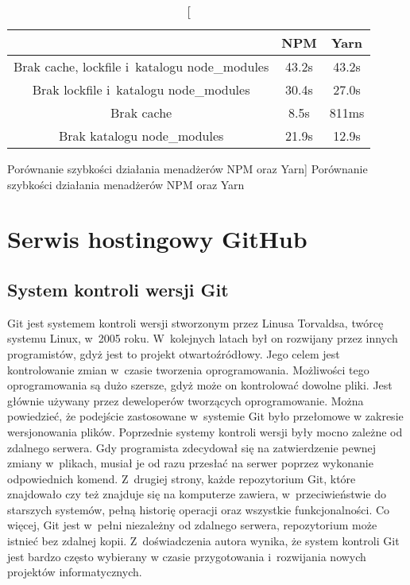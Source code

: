 \documentclass[../Kamil_Kowalewski_Main.tex]{subfiles}
\begin{document}
{{{            \begin{table}[H]
                \centering
                \begin{tabular}{|c|c|c|}
                    \hline
                    & NPM & Yarn \\ \hline
                    Brak cache, lockfile i~katalogu node\_modules & 43.2s & 43.2s \\\hline
                    Brak lockfile i~katalogu node\_modules & 30.4s & 27.0s \\ \hline
                    Brak cache & 8.5s & 811ms \\ \hline
                    Brak katalogu node\_modules & 21.9s & 12.9s \\ \hline
                \end{tabular}
                \caption
                [Porównanie szybkości działania menadżerów NPM oraz Yarn]
                {Porównanie szybkości działania menadżerów NPM oraz Yarn}
                \label{chapter3:technologie:node:yarn:tabela_porow}
            \end{table}
        }
    }

    \section{Serwis hostingowy GitHub}
    \label{chapter3:technologie:github} {

        \subsection{System kontroli wersji Git}
        \label{chapter3:technologie:github:git} {
            Git\cite{website:git} jest systemem kontroli wersji stworzonym przez
            Linusa Torvaldsa, twórcę systemu Linux, w~2005 roku. W~kolejnych latach był
            on rozwijany przez innych programistów, gdyż jest to projekt otwartoźródłowy.
            Jego celem jest kontrolowanie zmian w~czasie tworzenia oprogramowania. Możliwości
            tego oprogramowania są dużo szersze, gdyż może on kontrolować dowolne pliki.
            Jest głównie używany przez deweloperów tworzących oprogramowanie. Można
            powiedzieć, że podejście zastosowane w~systemie Git było przełomowe w zakresie
            wersjonowania plików. Poprzednie systemy kontroli wersji były mocno zależne od zdalnego
            serwera. Gdy programista zdecydował się na zatwierdzenie pewnej zmiany
            w~plikach, musiał je od razu przesłać na serwer poprzez wykonanie odpowiednich
            komend. Z~drugiej strony, każde repozytorium Git, które znajdowało czy też znajduje
            się na komputerze zawiera, w~przeciwieństwie do starszych systemów, pełną historię
            operacji oraz wszystkie funkcjonalności. Co więcej, Git jest w~pełni niezależny
            od zdalnego serwera, repozytorium może istnieć bez zdalnej kopii.
            Z~doświadczenia autora wynika, że system kontroli Git jest bardzo często
            wybierany w czasie przygotowania i~rozwijania nowych projektów
            informatycznych.
        }

}}
\end{document}
